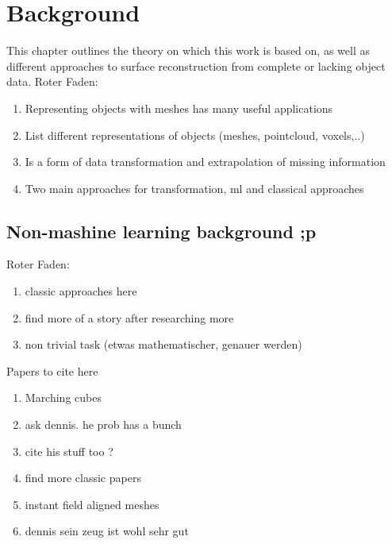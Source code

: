 \chapter{Background}
\label{sec:background}
This chapter outlines the theory on which this work is based on, as well as different approaches to surface reconstruction from complete or lacking object data.
Roter Faden:
\begin{enumerate}
  \item Representing objects with meshes has many useful applications
  \item List different representations of objects (meshes, pointcloud, voxels,..)
  \item Is a form of data transformation and extrapolation of missing information
  \item Two main approaches for transformation, ml and classical approaches
\end{enumerate}

\section{Non-mashine learning background ;p}
Roter Faden:
\begin{enumerate}
  \item classic approaches here
  \item find more of a story after researching more
  \item non trivial task  (etwas mathematischer, genauer werden)
\end{enumerate}
Papers to cite here
\begin{enumerate}
  \item Marching cubes
  \item ask dennis. he prob has a bunch
  \item cite his stuff too ?
  \item find more classic papers
  \item instant field aligned meshes
  \item dennis sein zeug ist wohl sehr gut
\end{enumerate}



